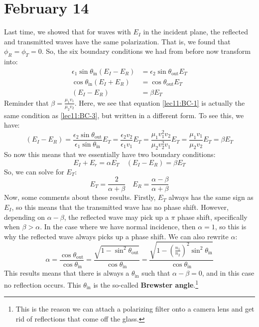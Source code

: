 \section{February 14}
Last time, we showed that for waves with \( E_I \) in the incident plane, the reflected and transmitted waves
have the same polarization. That is, we found that \( \phi_R = \phi_T = 0 \). So, the six boundary conditions
we had from before now transform into:
\begin{align}
	\label{lec11:BC-1}\epsilon_1 \sin \theta_\text{in}\left( E_I - E_R \right) 
	&= \epsilon_2 \sin \theta_\text{out} E_T\\
	\label{lec11:BC-2}\cos \theta_\text{in} (E_I + E_R) &= \cos \theta_\text{out}E_T\\
	\label{lec11:BC-3}(E_I - E_R) &=  \beta E_T 
\end{align}
Reminder that \( \beta = \frac{\mu_1v_1}{\mu_2 v_2} \). Here, we see that equation \ref{lec11:BC-1} is
actually the same condition as \ref{lec11:BC-3}, but written in a different form. To see this, we have:
\[
	(E_I - E_R) = \frac{\epsilon_2 \sin \theta_\text{out}}{\epsilon_1 \sin \theta_\text{in}} E_T =
	\frac{\epsilon_2 v_2}{\epsilon_1 v_1} E_T = \frac{\mu_1v_1^2 v_2}{\mu_2v_2^2 v_1}E_T =
	\frac{\mu_1v_1}{\mu_2v_2}E_T = \beta E_T
\]
So now this means that we essentially have two boundary conditions:
\[
	E_I + E_r = \alpha E_T \quad (E_I - E_R) = \beta E_T
\]
So, we can solve for \( E_T \):
\[
	E_T = \frac{2}{\alpha + \beta} \quad E_R = \frac{\alpha - \beta}{\alpha + \beta}
\]
Now, some comments about these results. Firstly, \( E_T \) always has the same sign as \( E_I \), so this
means that the transmitted wave has no phase shift. However, depending on \( \alpha
- \beta\), the reflected wave may pick up a \( \pi \) phase shift, specifically when \( \beta > \alpha \). In
the case where we have normal incidence, then \( \alpha = 1 \), so this is why the reflected wave always
picks up a phase shift. We can also rewrite \( \alpha \):
\[
	\alpha = \frac{\cos \theta_\text{out}}{\cos \theta_\text{in}} = \frac{\sqrt{1 - \sin^2
	\theta_\text{out}}}{\cos \theta_\text{in}} = \frac{\sqrt{1 - \left( \frac{n_1}{n_2} \right)^2 \sin^2
\theta_\text{in}}}{\cos \theta_\text{in}}
\]
This results means that there is always a \( \theta_\text{in} \) such that \( \alpha - \beta = 0 \), and in
this case no reflection occurs. This \( \theta_\text{in} \) is the so-called \textbf{Brewster
angle}.\footnote{This is the reason we can attach a polarizing filter onto a camera lens and get rid of
reflections that come off the glass.}

